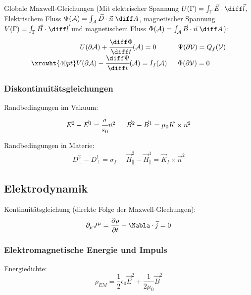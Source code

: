 \documentclass[11pt]{article}
\numberwithin{equation}{section}
\begin{document}
			Globale Maxwell-Gleichungen (Mit elektrischer Spannung $U(\Gamma)=\int_\Gamma \vec{E}\cdot\diff\vec{l}$, Elektrischem Fluss $\Psi(\mathcal{A})=\int_\mathcal{A}\vec{D}\cdot\vec{n}\;\diff A$, magnetischer Spannung $V(\Gamma)=\int_\Gamma \vec{H}\cdot\diff\vec{l}$ und magnetischem Fluss $\Phi(\mathcal{A})=\int_\mathcal{A}\vec{B}\cdot\vec{n}\;\diff A$):
			\begin{equation}
			\begin{array}{rl}
				U(\partial \mathcal{A}) + \cfrac{\diff\Phi}{\diff t}(\mathcal{A}) = 0\phantom{(\mathcal{A})}
				&\;\; \Psi(\partial\mathcal{V}) = Q_f(\mathcal{V}) \\ \xrowht{40pt}
				V(\partial \mathcal{A}) - \cfrac{\diff \Psi}{\diff t}(\mathcal{A}) = I_f(\mathcal{A})
				&\;\; \Phi(\partial\mathcal{V}) = 0 \\
			\end{array}
			\end{equation}

      \subsubsection{Diskontinuitätsgleichungen}
  			Randbedingungen im Vakuum:
  			\begin{equation}
  			\begin{array}{cc}
  				\vec{E}^2 - \vec{E}^1 = \cfrac{\sigma}{\varepsilon_0}\Vec{n}^2
  				&\;\; \vec{B}^2 - \vec{B}^1 = \mu_0\vec{K}\times\Vec{n}^2
  			\end{array}
  			\end{equation}

  			Randbedingungen in Materie:
  			\begin{equation}
  			\begin{array}{cc}
  				D_\perp^2 - D_\perp^1 = \sigma_f
  				&\;\; \vec{H}_\parallel^2 - \vec{H}_\parallel^1 = \vec{K}_f\times\Vec{n}^2
  			\end{array}
  			\end{equation}

    \subsection{Elektrodynamik}
      Kontinuitätsgleichung (direkte Folge der Maxwell-Glechungen):
      \begin{equation}
        \partial_\mu J^\mu = \pder{\rho}{t} + \Nabla\cdot\vec{j} = 0
      \end{equation}

      \subsubsection{Elektromagnetische Energie und Impuls}
        Energiedichte:
        \begin{equation}
          \rho_{EM}=\frac{1}{2}\epsilon_0 \vec{E}^2+\frac{1}{2\mu_0}\vec{B}^2
        \end{equation}
\end{document}
